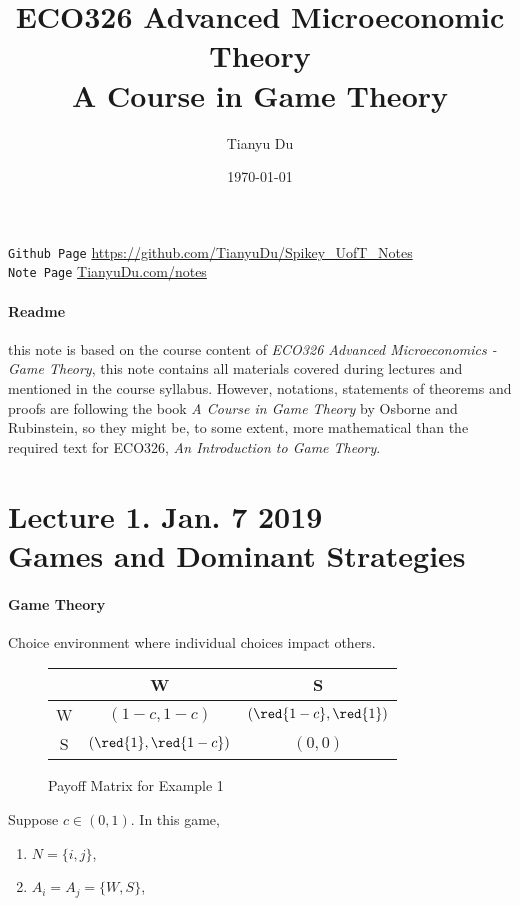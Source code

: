 \documentclass[11pt]{article}
\title{ECO326 Advanced Microeconomic Theory \\ \small A Course in Game Theory}
\author{Tianyu Du}
\date{\today}
\begin{document}
	\maketitle
	\doclicenseThis
	\texttt{Github Page} \url{https://github.com/TianyuDu/Spikey_UofT_Notes}\\
	\texttt{Note Page} \url{TianyuDu.com/notes}
	\paragraph{Readme} this note is based on the course content of \emph{ECO326 Advanced Microeconomics - Game Theory}, this note contains all materials covered during lectures and mentioned in the course syllabus. However, notations, statements of theorems and proofs are following the book \emph{A Course in Game Theory} by Osborne and Rubinstein, so they might be, to some extent, more mathematical than the required text for ECO326, \emph{An Introduction to Game Theory}.
	
	\tableofcontents
	\newpage
	
	\section{Lecture 1. Jan. 7 2019\\Games and Dominant Strategies}
		\paragraph{Game Theory} Choice environment where individual choices impact others.
		
		\begin{example}
			\begin{figure}[h]
				\centering
				  \begin{tabular}{c|c|c}
				    & W & S\\
				    \hline
				    W & $(1-c, 1-c)$ & $(\red{1-c}, \red{1})$ \\
				    \hline
				    S & $(\red{1}, \red{1-c})$ & $(0, 0)$
				  \end{tabular}
				  \caption{Payoff Matrix for Example 1}
			\end{figure}
		\end{example}
		Suppose $c \in (0, 1)$. In this game,
		\begin{enumerate}[i]
			\item $N = \{i, j\}$,
			\item $A_i = A_j = \{W, S\}$,
		\end{enumerate}
		
\end{document}
